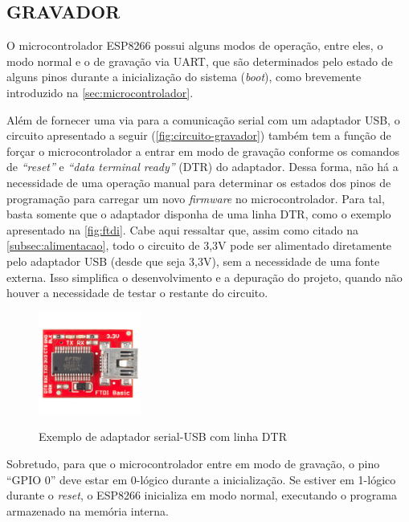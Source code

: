 \subsection{GRAVADOR}
\label{subsec:gravador}

O microcontrolador ESP8266 possui alguns modos de operação, entre eles, o modo normal e o de gravação via UART, que são determinados pelo estado de alguns pinos durante a inicialização do sistema (\emph{boot}), como brevemente introduzido na \autoref{sec:microcontrolador}.

Além de fornecer uma via para a comunicação serial com um adaptador USB, o circuito apresentado a seguir (\autoref{fig:circuito-gravador}) também tem a função de forçar o microcontrolador a entrar em modo de gravação conforme os comandos de \emph{``reset''} e \emph{``data terminal ready''} (DTR) do adaptador. Dessa forma, não há a necessidade de uma operação manual para determinar os estados dos pinos de programação para carregar um novo \emph{firmware} no microcontrolador. Para tal, basta somente que o adaptador disponha de uma linha DTR, como o exemplo apresentado na \autoref{fig:ftdi}. Cabe aqui ressaltar que, assim como citado na \autoref{subsec:alimentacao}, todo o circuito de 3,3V pode ser alimentado diretamente pelo adaptador USB (desde que seja 3,3V), sem a necessidade de uma fonte externa. Isso simplifica o desenvolvimento e a depuração do projeto, quando não houver a necessidade de testar o restante do circuito.

\begin{figure}[H]
    \centering
    \caption{Exemplo de adaptador serial-USB com linha DTR}
    \includegraphics[width=0.3\textwidth]{./dados/figuras/ftdi}
    \label{fig:ftdi}
\end{figure}

Sobretudo, para que o microcontrolador entre em modo de gravação, o pino ``GPIO 0'' deve estar em 0-lógico durante a inicialização. Se estiver em 1-lógico durante o \emph{reset}, o ESP8266 inicializa em modo normal, executando o programa armazenado na memória interna.

